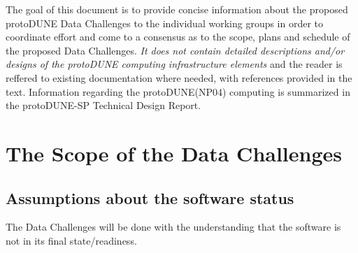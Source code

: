 \documentclass[pdftex,12pt,letter]{article}
\newcommand{\pd}{protoDUNE\xspace}
\begin{document}
The goal of this document is to provide concise information about the proposed \pd Data Challenges
to the individual working groups in order to coordinate effort and come to a consensus as to the scope,
plans and schedule of the proposed Data Challenges. \textit{It does not contain detailed descriptions
and/or designs of the \pd computing
infrastructure elements} and the reader is reffered to existing documentation where
needed, with references provided in the text.
Information regarding the \pd (NP04) computing is summarized in the \pd-SP Technical Design Report\cite{docdb1794}.

\section{The Scope of the Data Challenges}
\subsection{Assumptions about the software status}
The Data Challenges will be done with the understanding that the software is not in its final state/readiness. 
\end{document}
